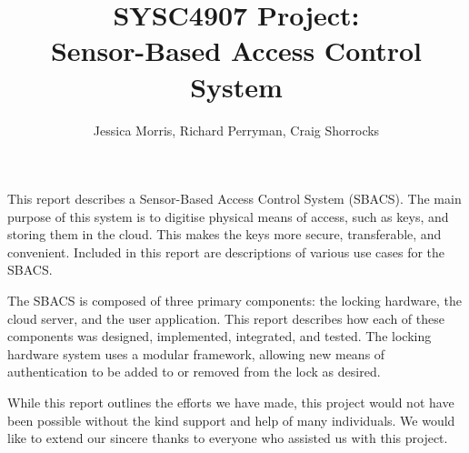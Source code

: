 \documentclass[12pt]{report}
\begin{document}
\title{SYSC4907 Project: \\ Sensor-Based Access Control System}
\author{
    Jessica Morris,
    Richard Perryman,
    Craig Shorrocks
}

\copyrightfalse %

\beforepreface



This report describes a Sensor-Based Access Control System (SBACS). The main purpose of this system is to digitise 
physical means of access, such as keys, and storing them in the cloud. This makes the keys more secure, transferable, 
and convenient. Included in this report are descriptions of various use cases for the SBACS.

The SBACS is composed of three primary components: the locking hardware, the cloud server, and the user application. 
This report describes how each of these components was designed, implemented, integrated, and tested. The locking 
hardware system uses a modular framework, allowing new means of authentication to be added to or removed from the lock 
as desired.




While this report outlines the efforts we have made, this project would not have been possible without the kind 
support and help of many individuals. We would like to extend our sincere thanks to everyone who assisted us with this 
project.
\end{document}
